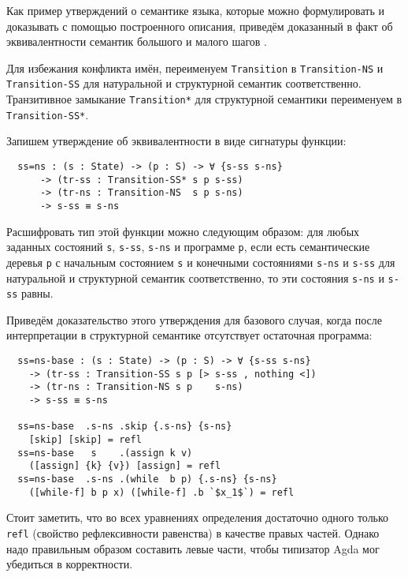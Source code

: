 \documentclass[aps,12pt,final,oneside,onecolumn,musixtex,superscriptaddress,centertags]{article}
\newcommand{\lcode}[1]{\lstinline[basicstyle=\ttfamily\normalsize]{#1}}
\begin{document}
  Как пример утверждений о семантике языка, которые можно формулировать и доказывать с помощью построенного описания, приведём доказанный в \cite{Nielson:1992:SAF:129085} факт об эквивалентности семантик большого и малого шагов \While.

  Для избежания конфликта имён, переименуем \lcode{Transition} в \lcode{Transition-NS} и \lcode{Transition-SS} для натуральной и структурной семантик соответственно. Транзитивное замыкание \lcode{Transition*} для структурной семантики переименуем в \lcode{Transition-SS*}.

  \noindent\begin{minipage}[c]{\linewidth}
  Запишем утверждение об эквивалентности в виде сигнатуры функции:
  \begin{lstlisting}
  ss=ns : (s : State) -> (p : S) -> ∀ {s-ss s-ns}
      -> (tr-ss : Transition-SS* s p s-ss)
      -> (tr-ns : Transition-NS  s p s-ns)
      -> s-ss ≡ s-ns
  \end{lstlisting}
  \end{minipage}

  Расшифровать тип этой функции можно следующим образом: для любых заданных состояний \lcode{s}, \lcode{s-ss}, \lcode{s-ns} и программе \lcode{p}, если есть семантические деревья \lcode{p} с начальным состоянием \lcode{s} и конечными состояниями \lcode{s-ns} и \lcode{s-ss} для натуральной и структурной семантик соответственно, то эти состояния \lcode{s-ns} и \lcode{s-ss} равны.

  Приведём доказательство этого утверждения для базового случая, когда после интерпретации в структурной семантике отсутствует остаточная программа:
  \begin{lstlisting}
  ss=ns-base : (s : State) -> (p : S) -> ∀ {s-ss s-ns}
    -> (tr-ss : Transition-SS s p [> s-ss , nothing <])
    -> (tr-ns : Transition-NS s p    s-ns)
    -> s-ss ≡ s-ns

  ss=ns-base  .s-ns .skip {.s-ns} {s-ns}
    [skip] [skip] = refl
  ss=ns-base   s    .(assign k v)
    ([assign] {k} {v}) [assign] = refl
  ss=ns-base  .s-ns .(while  b p) {.s-ns} {s-ns}
    ([while-f] b p x) ([while-f] .b `$x_1$`) = refl
  \end{lstlisting}

  Стоит заметить, что во всех уравнениях определения достаточно одного только \lcode{refl} (свойство рефлексивности равенства) в качестве правых частей. Однако надо правильным образом составить левые части, чтобы типизатор Agda мог убедиться в корректности.
\end{document}
